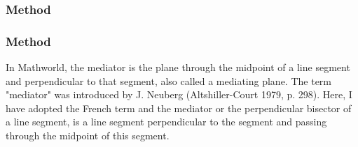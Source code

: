
\begin{center}
\end{center}


\subsubsection{Method } %
\label{ssub:newline_ortho_from}

\begin{tkzexample}[latex=7cm]
  \begin{center}
  \end{center}
\end{tkzexample}

\subsubsection{Method } %
\label{ssub:method_imeth_line_mediator}

In Mathworld, the mediator is the plane through the midpoint of a line segment and perpendicular to that segment, also called a mediating plane. The term "mediator" was introduced by J. Neuberg (Altshiller-Court 1979, p. 298). Here, I have adopted the French term and the mediator or
the perpendicular bisector  of a line segment, is a line segment perpendicular to the segment and passing through the midpoint of this segment.


